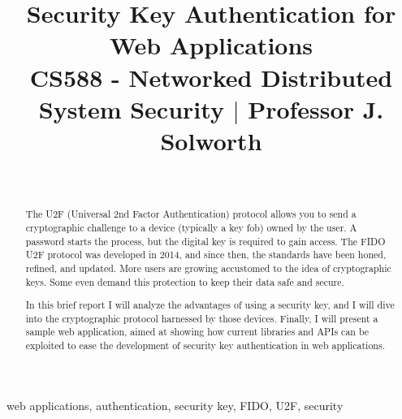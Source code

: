 \documentclass[10pt, conference]{IEEEtran}
\begin{document}
\title{\textbf{Security Key Authentication for Web Applications}\\
{\small CS588 - Networked Distributed System Security $\mid$ Professor J. Solworth}
}

\author{
\\
}

\maketitle
\thispagestyle{plain}
\pagestyle{plain}

\begin{abstract}
    The U2F (Universal 2nd Factor Authentication) protocol allows you to send a cryptographic challenge to a device (typically a key fob) owned by the user. A password starts the process, but the digital key is required to gain access. The FIDO U2F protocol was developed in 2014, and since then, the standards have been honed, refined, and updated. More users are growing accustomed to the idea of cryptographic keys. Some even demand this protection to keep their data safe and secure.

    In this brief report I will analyze the advantages of using a security key, and I will dive into the cryptographic protocol harnessed by those devices. Finally, I will present a sample web application, aimed at showing how current libraries and APIs can be exploited to ease the development of security key authentication in web applications.
\end{abstract}

\begin{IEEEkeywords}
    web applications, authentication, security key, FIDO, U2F, security
\end{IEEEkeywords}








\vspace{12pt}



\end{document}
